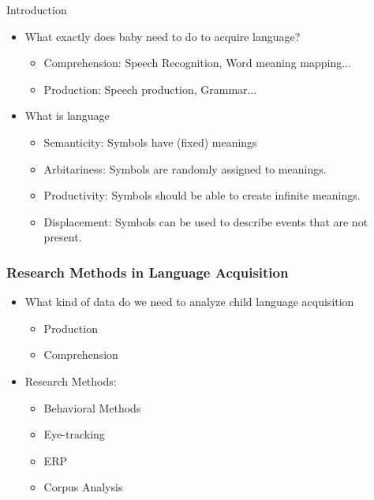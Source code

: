 \documentclass{beamer}
\begin{document}
\begin{frame}{Introduction}
\begin{itemize}
\item What exactly does baby need to do to acquire language?
\pause 
    \begin{itemize}
        \item Comprehension: Speech Recognition, Word meaning mapping...
        \item Production: Speech production, Grammar...
\end{itemize}
\pause
\item What is language
\begin{itemize}
    \item Semanticity:
    \pause Symbols have (fixed) meanings
    \pause 
    \item Arbitariness: 
    \pause Symbols are randomly assigned to meanings.
    \pause 
    \item Productivity:
    \pause Symbols should be able to create infinite meanings.
    \pause 
    \item Displacement:
    \pause Symbols can be used to describe events that are not present.
\end{itemize}
\end{itemize}
\end{frame}
\begin{frame}
\frametitle{Research Methods in Language Acquisition}
\begin{itemize}
\item  What kind of data do we need to analyze child language acquisition
\pause 
    \begin{itemize}
        \item Production
        \pause
        \item Comprehension
    \end{itemize}
\pause
\item Research Methods:
\pause
\begin{itemize}
        \item Behavioral Methods
        \pause
        \item Eye-tracking
        \pause 
        \item ERP
        \pause
        \item Corpus Analysis
    \end{itemize}
\end{itemize}
\end{frame}
\end{document}

